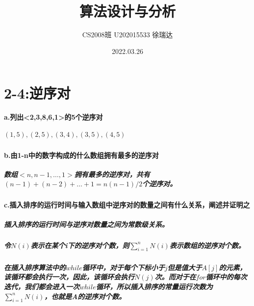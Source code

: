 \documentclass[a4paper]{article}
\title{\heiti\zihao{2} 算法设计与分析}
\author{\songti CS2008班   U202015533  徐瑞达}
\date{2022.03.26}
\begin{document}
\maketitle
\section{2-4:逆序对}
\paragraph{a.列出<2,3,8,6,1>的5个逆序对}
\subparagraph{$(1,5),(2,5),(3,4),(3,5),(4,5)$}
\paragraph{b.由1-n中的数字构成的什么数组拥有最多的逆序对}
\subparagraph{数组$<n,n-1,\dots,1>$拥有最多的逆序对，共有$(n-1)+(n-2)+ \dots +1=n(n-1)/2$个逆序对。}
\paragraph{c.插入排序的运行时间与输入数组中逆序对的数量之间有什么关系，阐述并证明之}
\subparagraph{插入排序的运行时间与逆序对数量之间为常数级关系。}
\subparagraph{令$N(i)$表示在某个i下的逆序对个数，则$\sum_{i=1}^nN(i)$表示数组的逆序对个数。}
\subparagraph{在插入排序算法中的$while$循环中，对于每个下标小于$j$但是值大于$A[j]$的元素，该循环都会执行一次，因此，该循环会执行$N(j)$次。而对于在$for$循环中的每次迭代，我们都会进入一次$while$循环，所以插入排序的常量运行次数为$\sum_{i=1}^nN(i)$，也就是A的逆序对个数。}
\end{document}

